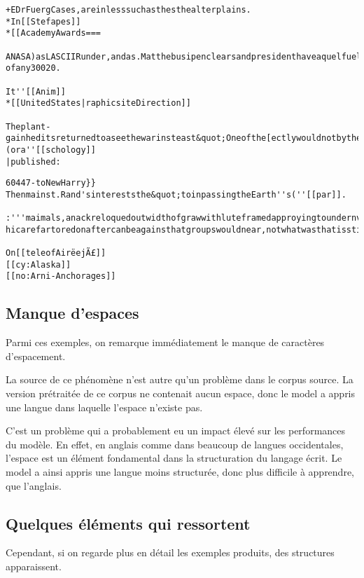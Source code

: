 \begin{lstlisting}[caption={Exemple 2~: des termes balisés comme dans le corpus d'origine, les crochets ouverts sont refermés},label=gmsnn_ex2]
+EDrFuergCases,areinlesssuchasthesthealterplains.
*In[[Stefapes]]
*[[AcademyAwards===

ANASA)asLASCIIRunder,andas.MatthebusipenclearsandpresidenthaveaquelfuelsifthesearchfromAwarerLievol ofany30020.

It''[[Anim]]
*[[UnitedStates|raphicsiteDirection]]

Theplant-gainheditsreturnedtoaseethewarinsteast&quot;Oneofthe[ectlywouldnotbytheIntegrationscapianland](ora''[[schology]]
|published:
\end{lstlisting}
\pagebreak
\begin{lstlisting}[caption={Exemple 3~: des termes balisés comme dans l'exemple 2, et une autre suite de caractères},label=gmsnn_ex3]
60447-toNewHarry}}
Thenmainst.Rand'sintereststhe&quot;toinpassingtheEarth''s(''[[par]].

:'''maimals,anackreloquedoutwidthofgrawwithluteframedapproyingtoundernverby[[hebesination]]of&lt;/smalkan,instablishedacondorttodevelopedframesbeforestatedwinkingaroundinrational hicarefartoredonaftercanbeagainsthatgroupswouldnear,notwhatwasthatisstillastructionCenter,toDagnythat

On[[teleofAirëejÃ£]]
[[cy:Alaska]]
[[no:Arni-Anchorages]]
\end{lstlisting}

\subsection{Manque d'espaces}\label{whitespace_problem}
Parmi ces exemples, on remarque immédiatement le manque de caractères d'espacement.

La source de ce phénomène n'est autre qu'un problème dans le corpus source.
La version prétraitée de ce corpus ne contenait aucun espace, donc le \gls{model} a appris une langue dans laquelle l'espace n'existe pas.

C'est un problème qui a probablement eu un impact élevé sur les performances du modèle. En effet, en anglais comme dans beaucoup de langues occidentales, l'espace est un élément fondamental dans la structuration du langage écrit. Le \gls{model} a ainsi appris une langue moins structurée, donc plus difficile à apprendre, que l'anglais.

\subsection{Quelques éléments qui ressortent}
Cependant, si on regarde plus en détail les exemples produits, des structures apparaissent. 

